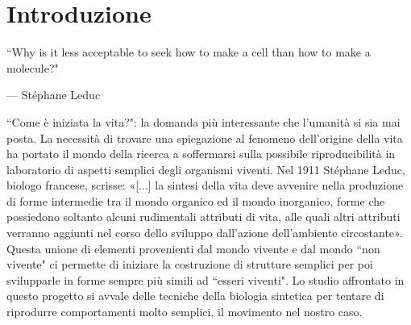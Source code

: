 \chapter{Introduzione}
\vspace{0.5cm}
\label{cha:intro}
\epigraph{``Why is it less acceptable to seek how to make a cell than how to make a molecule?"}{--- \textup{Stéphane Leduc}}

``Come è iniziata la vita?": la domanda più interessante che l'umanità si sia mai posta. La necessità di trovare una spiegazione al fenomeno dell'origine della vita ha portato il mondo della ricerca a soffermarsi sulla possibile riproducibilità in laboratorio di aspetti semplici degli organismi viventi. 
Nel 1911 Stéphane Leduc, biologo francese, scrisse: «[...] la sintesi della vita deve avvenire nella produzione di forme intermedie tra il mondo organico ed il mondo inorganico, forme che possiedono soltanto alcuni rudimentali attributi di vita, alle quali altri attributi verranno aggiunti nel corso dello sviluppo dall'azione dell'ambiente circostante». Questa unione di elementi provenienti dal mondo vivente e dal mondo ``non vivente" ci permette di iniziare la costruzione di strutture semplici per poi svilupparle in forme sempre più simili ad ``esseri viventi". 
Lo studio affrontato in questo progetto si avvale delle tecniche della biologia sintetica per tentare di riprodurre comportamenti molto semplici, il movimento nel nostro caso.

